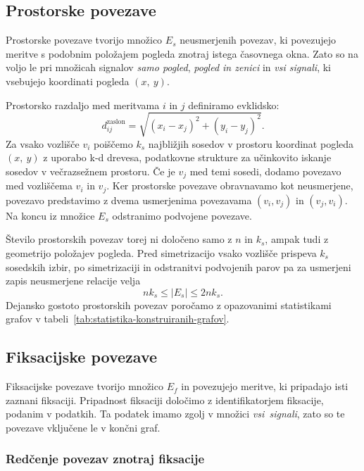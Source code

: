 \subsection{Prostorske povezave}
\label{subsec:prostorske-povezave}
Prostorske povezave tvorijo množico $E_s$ neusmerjenih povezav, ki povezujejo meritve s podobnim položajem pogleda znotraj istega časovnega okna.
Zato so na voljo le pri množicah signalov \emph{samo pogled}, \emph{pogled in zenici} in \emph{vsi signali}, ki vsebujejo koordinati pogleda $(x,~y)$.

Prostorsko razdaljo med meritvama $i$ in $j$ definiramo evklidsko:
\begin{equation}
    d_{ij}^{\text{zaslon}} =
    \sqrt{(x_i - x_j)^2 + (y_i - y_j)^2}.
\end{equation}
Za vsako vozlišče $v_i$ poiščemo $k_s$ najbližjih sosedov v prostoru koordinat pogleda $(x,~y)$ z uporabo k-d drevesa, podatkovne strukture za učinkovito iskanje sosedov v večrazsežnem prostoru. Če je $v_j$ med temi sosedi, dodamo povezavo med vozliščema $v_i$ in $v_j$.
Ker prostorske povezave obravnavamo kot neusmerjene, povezavo predstavimo z dvema usmerjenima povezavama $(v_i,v_j)$ in $(v_j,v_i)$.
Na koncu iz množice $E_s$ odstranimo podvojene povezave.

Število prostorskih povezav torej ni določeno samo z $n$ in $k_s$, ampak tudi z geometrijo položajev pogleda.
Pred simetrizacijo vsako vozlišče prispeva $k_s$ sosedskih izbir, po simetrizaciji in odstranitvi podvojenih parov pa za usmerjeni zapis neusmerjene relacije velja
\begin{equation}
    n k_s \leq |E_s| \leq 2 n k_s.
\end{equation}
Dejansko gostoto prostorskih povezav poročamo z opazovanimi statistikami grafov v tabeli~\ref{tab:statistika-konstruiranih-grafov}.

\subsection{Fiksacijske povezave}
\label{subsec:fiksacijske-povezave}

Fiksacijske povezave tvorijo množico $E_f$ in povezujejo meritve, ki pripadajo isti zaznani fiksaciji.
Pripadnost fiksaciji določimo z identifikatorjem fiksacije, podanim v \MAHNOB{} podatkih.
Ta podatek imamo zgolj v množici \emph{vsi~signali}, zato so te povezave vključene le v končni graf.

\subsubsection*{Redčenje povezav znotraj fiksacije}

